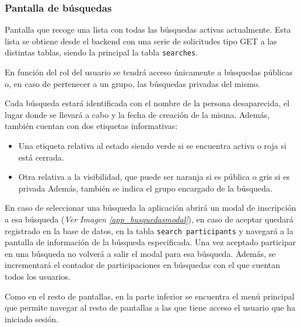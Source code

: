     \subsubsection{Pantalla de búsquedas}

    Pantalla que recoge una lista con todas las búsquedas activas actualmente. Esta lista se obtiene desde el backend con una serie de solicitudes tipo GET a las distintas tablas, siendo la principal la tabla \texttt{searches}.
    
    En función del rol del usuario se tendrá acceso únicamente a búsquedas públicas o, en caso de pertenecer a un grupo, las búsquedas privadas del mismo. 

    Cada búsqueda estará identificada con el nombre de la persona desaparecida, el lugar donde se llevará a cabo y la fecha de creación de la misma. Además, también cuentan con dos etiquetas informativas:
    \begin{itemize}
        \item Una etiqueta relativa al estado siendo verde si se encuentra activa o roja si está cerrada.
        \item Otra relativa a la visibilidad, que puede ser naranja si es pública o gris si es privada  Además, también se indica el grupo encargado de la búsqueda.
    \end{itemize}

    En caso de seleccionar una búsqueda la aplicación abrirá un modal de inscripción a esa búsqueda (\textit{Ver Imagen \ref{app_busquedasmodal}}), en caso de aceptar quedará registrado en la base de datos, en la tabla \texttt{search participants} y navegará a la pantalla de información de la búsqueda especificada. Una vez aceptado participar en una búsqueda no volverá a salir el modal para esa búsqueda. Además, se incrementará el contador de participaciones en búsquedas con el que cuentan todos los usuarios.

    Como en el resto de pantallas, en la parte inferior se encuentra el menú principal que permite navegar al resto de pantallas a las que tiene acceso el usuario que ha iniciado sesión.

